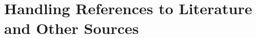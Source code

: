 \chapter[Case study]{Handling References to Literature and Other Sources}
\label{cha:Literature}








